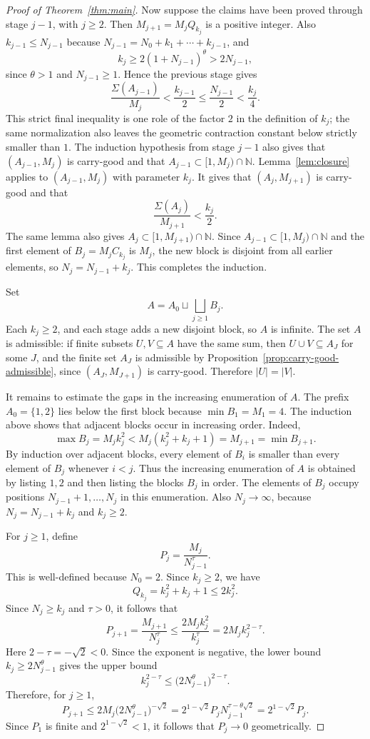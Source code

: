 \documentclass[11pt]{article}
\newcommand{\N}{\mathbb{N}}
\newcommand{\Sig}{\Sigma}
\begin{document}
\begin{proof}[Proof of Theorem~\ref{thm:main}]
Now suppose the claims have been proved through stage $j-1$, with $j\ge2$.  Then $M_{j+1}=M_j Q_{k_j}$ is a positive integer.  Also $k_{j-1}\le N_{j-1}$ because $N_{j-1}=N_0+k_1+\cdots+k_{j-1}$, and
\[
        k_j\ge 2(1+N_{j-1})^\theta>2N_{j-1},
\]
since $\theta>1$ and $N_{j-1}\ge1$.  Hence the previous stage gives
\[
        \frac{\Sig(A_{j-1})}{M_j}<\frac{k_{j-1}}2\le \frac{N_{j-1}}2
        <\frac{k_j}{4}.
\]
This strict final inequality is one role of the factor $2$ in the definition of $k_j$; the same normalization also leaves the geometric contraction constant below strictly smaller than $1$.  The induction hypothesis from stage $j-1$ also gives that $(A_{j-1},M_j)$ is carry-good and that $A_{j-1}\subset[1,M_j)\cap\N$.  Lemma~\ref{lem:closure} applies to $(A_{j-1},M_j)$ with parameter $k_j$.  It gives that $(A_j,M_{j+1})$ is carry-good and that
\[
        \frac{\Sig(A_j)}{M_{j+1}}<\frac{k_j}{2}.
\]
The same lemma also gives $A_j\subset[1,M_{j+1})\cap\N$.  Since $A_{j-1}\subset[1,M_j)\cap\N$ and the first element of $B_j=M_jC_{k_j}$ is $M_j$, the new block is disjoint from all earlier elements, so $N_j=N_{j-1}+k_j$.  This completes the induction.

Set
\[
        A=A_0\sqcup\bigsqcup_{j\ge1}B_j.
\]
Each $k_j\ge2$, and each stage adds a new disjoint block, so $A$ is infinite.  The set $A$ is admissible: if finite subsets $U,V\subseteq A$ have the same sum, then $U\cup V\subseteq A_J$ for some $J$, and the finite set $A_J$ is admissible by Proposition~\ref{prop:carry-good-admissible}, since $(A_J,M_{J+1})$ is carry-good.  Therefore $|U|=|V|$.

It remains to estimate the gaps in the increasing enumeration of $A$.  The prefix $A_0=\{1,2\}$ lies below the first block because $\min B_1=M_1=4$.  The induction above shows that adjacent blocks occur in increasing order.  Indeed,
\[
        \max B_j=M_j k_j^2<M_j(k_j^2+k_j+1)=M_{j+1}=\min B_{j+1}.
\]
By induction over adjacent blocks, every element of $B_i$ is smaller than every element of $B_j$ whenever $i<j$.  Thus the increasing enumeration of $A$ is obtained by listing $1,2$ and then listing the blocks $B_j$ in order.  The elements of $B_j$ occupy positions $N_{j-1}+1,\ldots,N_j$ in this enumeration.  Also $N_j\to\infty$, because $N_j=N_{j-1}+k_j$ and $k_j\ge2$.

For $j\ge1$, define
\[
        P_j=\frac{M_j}{N_{j-1}^{\tau}}.
\]
This is well-defined because $N_0=2$.  Since $k_j\ge2$, we have
\[
        Q_{k_j}=k_j^2+k_j+1\le2k_j^2.
\]
Since $N_j\ge k_j$ and $\tau>0$, it follows that
\[
        P_{j+1}
        =\frac{M_{j+1}}{N_j^\tau}
        \le
        \frac{2M_j k_j^2}{k_j^\tau}
        =2M_j k_j^{2-\tau}.
\]
Here $2-\tau=-\sqrt2<0$.  Since the exponent is negative, the lower bound $k_j\ge2N_{j-1}^{\theta}$ gives the upper bound
\[
        k_j^{2-\tau}\le \bigl(2N_{j-1}^{\theta}\bigr)^{2-\tau}.
\]
Therefore, for $j\ge1$,
\[
        P_{j+1}
        \le
        2M_j\bigl(2N_{j-1}^{\theta}\bigr)^{-\sqrt2}
        =2^{1-\sqrt2}P_jN_{j-1}^{\tau-\theta\sqrt2}
        =2^{1-\sqrt2}P_j.
\]
Since $P_1$ is finite and $2^{1-\sqrt2}<1$, it follows that $P_j\to0$ geometrically.


\end{proof}
\end{document}
